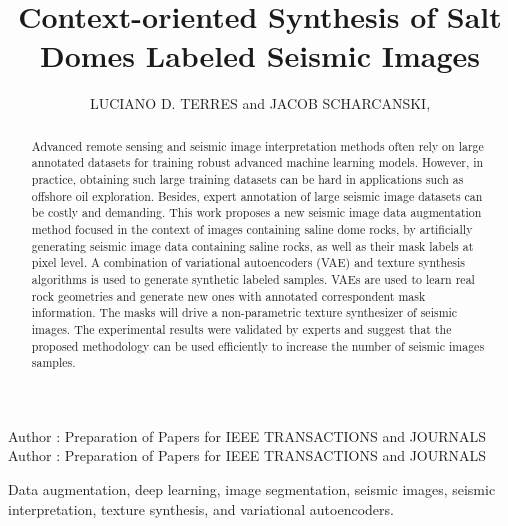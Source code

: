 \documentclass{ieeeaccess}
\providecommand{\DIFadd}[1]{{\protect\color{blue}\uwave{#1}}} %
\providecommand{\DIFaddbegin}{} %
\providecommand{\DIFaddend}{} %
\newcommand{\DIFaddincludegraphics}[2][]{{\color{blue}\fbox{\DIFOincludegraphics[#1]{#2}}}} %
\DeclareRobustCommand{\DIFaddbegin}{\DIFOaddbegin \let\includegraphics\DIFaddincludegraphics} %
\DeclareRobustCommand{\DIFaddend}{\DIFOaddend \let\includegraphics\DIFOincludegraphics} %
\begin{document}

\title{Context-oriented Synthesis of Salt Domes \DIFaddbegin \DIFadd{in }\DIFaddend Labeled Seismic Images}
\author{\uppercase{Luciano D. Terres} and
\uppercase{Jacob Scharcanski},  }

\address[1]{Institute of Informatics,
Federal University of Rio Grande do Sul, Porto Alegre, RS, Brasil, 91501-970, e-mail: ldterres@inf.ufrgs.br}
\address[2]{Institute of Informatics, 
Federal University of Rio Grande do Sul, Porto Alegre, RS, Brasil, 91501-970, e-mail: jacobs@inf.ufrgs.br}

\markboth
{Author \headeretal: Preparation of Papers for IEEE TRANSACTIONS and JOURNALS}
{Author \headeretal: Preparation of Papers for IEEE TRANSACTIONS and JOURNALS}



\begin{abstract}
Advanced remote sensing and seismic image interpretation methods often rely on large annotated datasets for training robust advanced machine learning models. However, in practice, obtaining such large training datasets can be hard in applications such as offshore oil exploration. Besides, expert annotation of large seismic image datasets can be costly and demanding. This work proposes a new seismic image data augmentation method focused in the context of images containing saline dome rocks, by artificially generating seismic image data containing saline rocks, as well as their mask labels at pixel level. A combination of variational autoencoders (VAE) and texture synthesis algorithms is used to generate synthetic labeled samples. VAEs are used to learn real rock geometries and generate new ones with annotated correspondent mask information. The masks will drive a non-parametric texture synthesizer of seismic images. The experimental results were validated by experts and suggest that the proposed methodology can be used efficiently to increase the number of seismic images samples. 
\end{abstract}

\begin{keywords}
Data augmentation, deep learning, image segmentation, seismic images, seismic interpretation, texture synthesis, and variational autoencoders.
\end{keywords}
\end{document}

